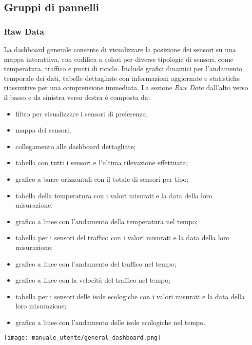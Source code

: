\subsection{Gruppi di pannelli}
\subsubsection{Raw Data}
La dashboard generale consente di visualizzare la posizione dei sensori su una mappa interattiva, con codifica a colori per diverse tipologie di sensori, come temperatura, traffico e punti di riciclo. Include grafici dinamici per l'andamento temporale dei dati, tabelle dettagliate con informazioni aggiornate e statistiche riassuntive per una comprensione immediata. La sezione \textit{Raw Data} dall'alto verso il basso e da sinistra verso destra è composta da:
\begin{itemize}
    \item filtro per visualizzare i sensori di preferenza;
    \item mappa dei sensori;
    \item collegamento alle dashboard dettagliate;
    \item tabella con tutti i sensori e l'ultima rilevazione effettuata;
    \item grafico a barre orizzontali con il totale di sensori per tipo;
    \item tabella della temperatura con i valori misurati e la data della loro misurazione;
    \item grafico a linee con l'andamento della temperatura nel tempo;
    \item tabella per i sensori del traffico con i valori misurati e la data della loro misurazione;
    \item grafico a linee con l'andamento del traffico nel tempo;
    \item grafico a linee con la velocità del traffico nel tempo;
    \item tabella per i sensori delle isole ecologiche con i valori misurati e la data della loro misurazione;
    \item grafico a linee con l'andamento delle isole ecologiche nel tempo.
\end{itemize}
\begin{center}
    \texttt{[image: manuale\_utente/general\_dashboard.png]}
\end{center}

\newpage

